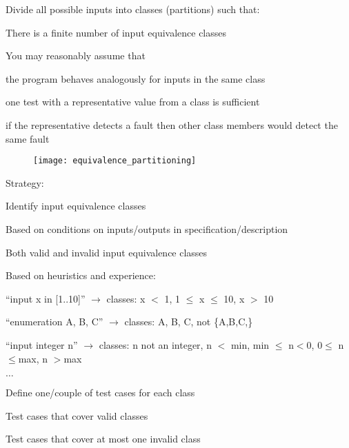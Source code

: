 Divide all possible inputs into classes (partitions) such that:
\begin{itemize*}
	\item There is a finite number of input equivalence classes
	\item You may reasonably assume that
	\begin{itemize*}
		\item the program behaves analogously for inputs in the same class
		\item one test with a representative value from a class is sufficient
		\item if the representative detects a fault
		then other class members would detect the same fault
	\end{itemize*}
\end{itemize*}

\begin{figure}[h!]
	\centering
	\texttt{[image: equivalence\_partitioning]}
\end{figure}

Strategy:
\begin{itemize*}
	\item Identify input equivalence classes
	\begin{itemize*}
		\item Based on conditions on inputs/outputs in specification/description
		\item Both valid and invalid input equivalence classes
		\item Based on heuristics and experience:
		\begin{itemize*}
			\item ``input x in [1..10]''
			$\rightarrow$ classes: x $<$ 1, 1 $\leq$ x $\leq$ 10, x $>$ 10
			\item ``enumeration A, B, C'' $\rightarrow$ classes: A, B, C, not \{A,B,C,\}
			\item ``input integer n''
			$\rightarrow$ classes: n not an integer,
			n $<$ min, min $\leq$ n$<$0, 0$\leq$ n $\leq$max, n $>$max
			\item$\ldots$
		\end{itemize*}
	\end{itemize*}
	\item Define one/couple of test cases for each class
	\begin{itemize*}
		\item Test cases that cover valid classes
		\item Test cases that cover at most one invalid class
	\end{itemize*}
\end{itemize*}

